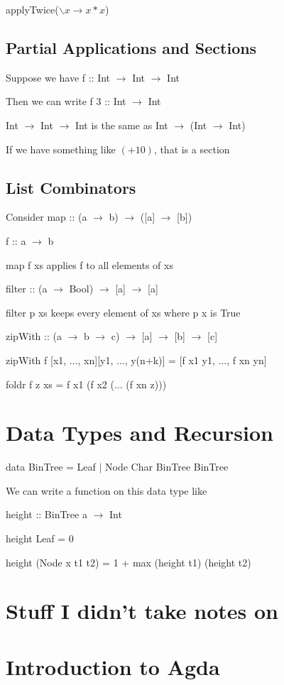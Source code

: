 \documentclass[12pt]{article}
\begin{document}
applyTwice($\backslash x \to x * x$)

\subsection{Partial Applications and Sections}

Suppose we have f :: Int $\to$ Int $\to$ Int

Then we can write f 3 :: Int $\to$ Int

Int $\to$ Int $\to$ Int is the same as Int $\to$ (Int $\to$ Int)

If we have something like $(+ 10)$, that is a section

\subsection{List Combinators}

Consider map :: (a $\to$ b) $\to$ ([a] $\to$ [b])

f :: a $\to$ b

map f xs applies f to all elements of xs

filter :: (a $\to$ Bool) $\to$ [a] $\to$ [a]

filter p xs keeps every element of xs where p x is True

zipWith :: (a $\to$ b $\to$ c) $\to$ [a] $\to$ [b] $\to$ [c]

zipWith f [x1, ..., xn][y1, ..., y(n+k)] = [f x1 y1, ..., f xn yn]

foldr f z xs = f x1 (f x2 (... (f xn z)))

\section{Data Types and Recursion}

data BinTree = Leaf $|$ Node Char BinTree BinTree

We can write a function on this data type like

height :: BinTree a $\to$ Int

height Leaf = 0

height (Node x t1 t2) = 1 + max (height t1) (height t2)

\section{Stuff I didn't take notes on}

\section{Introduction to Agda}
\end{document}
